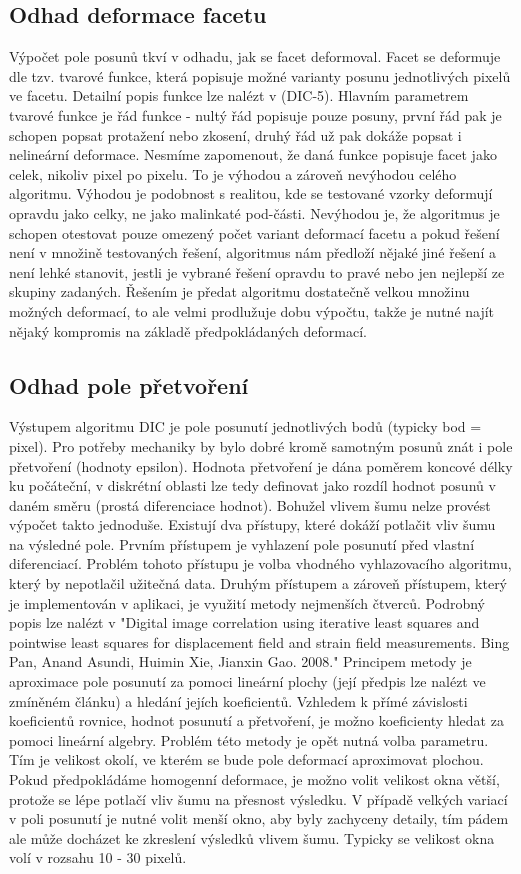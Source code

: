 \documentclass[a4paper,12pt]{article}
\begin{document}
\subsection{Odhad deformace facetu}
Výpočet pole posunů tkví v odhadu, jak se facet deformoval. Facet se deformuje dle tzv. tvarové funkce, která popisuje možné varianty posunu jednotlivých pixelů ve facetu. Detailní popis funkce lze nalézt v (DIC-5). Hlavním parametrem tvarové funkce je řád funkce - nultý řád popisuje pouze posuny, první řád pak je schopen popsat protažení nebo zkosení, druhý řád už pak dokáže popsat i nelineární deformace. Nesmíme zapomenout, že daná funkce popisuje facet jako celek, nikoliv pixel po pixelu. To je výhodou a zároveň nevýhodou celého algoritmu. Výhodou je podobnost s realitou, kde se testované vzorky deformují opravdu jako celky, ne jako malinkaté pod-části. Nevýhodou je, že algoritmus je schopen otestovat pouze omezený počet variant deformací facetu a pokud řešení není v množině testovaných řešení, algoritmus nám předloží nějaké jiné řešení a není lehké stanovit, jestli je vybrané řešení opravdu to pravé nebo jen nejlepší ze skupiny zadaných. Řešením je předat algoritmu dostatečně velkou množinu možných deformací, to ale velmi prodlužuje dobu výpočtu, takže je nutné najít nějaký kompromis na základě předpokládaných deformací.
\subsection{Odhad pole přetvoření}
Výstupem algoritmu DIC je pole posunutí jednotlivých bodů (typicky bod = pixel). Pro potřeby mechaniky by bylo dobré kromě samotným posunů znát i pole přetvoření (hodnoty epsilon). Hodnota přetvoření je dána poměrem koncové délky ku počáteční, v diskrétní oblasti lze tedy definovat jako rozdíl hodnot posunů v daném směru (prostá diferenciace hodnot). Bohužel vlivem šumu nelze provést výpočet takto jednoduše. Existují dva přístupy, které dokáží potlačit vliv šumu na výsledné pole. Prvním přístupem je vyhlazení pole posunutí před vlastní diferenciací. Problém tohoto přístupu je volba vhodného vyhlazovacího algoritmu, který by nepotlačil užitečná data. Druhým přístupem a zároveň přístupem, který je implementován v aplikaci, je využití metody nejmenších čtverců. Podrobný popis lze nalézt v "Digital image correlation using iterative least squares and pointwise least squares for displacement field and strain field measurements. Bing Pan, Anand Asundi, Huimin Xie, Jianxin Gao. 2008." Principem metody je aproximace pole posunutí za pomoci lineární plochy (její předpis lze nalézt ve zmíněném článku) a hledání jejích koeficientů. Vzhledem k přímé závislosti koeficientů rovnice, hodnot posunutí a přetvoření, je možno koeficienty hledat za pomoci lineární algebry. Problém této metody je opět nutná volba parametru. Tím je velikost okolí, ve kterém se bude pole deformací aproximovat plochou. Pokud předpokládáme homogenní deformace, je možno volit velikost okna větší, protože se lépe potlačí vliv šumu na přesnost výsledku. V případě velkých variací v poli posunutí je nutné volit menší okno, aby byly zachyceny detaily, tím pádem ale může docházet ke zkreslení výsledků vlivem šumu. Typicky se velikost okna volí v rozsahu 10 - 30 pixelů.
\newpage
\end{document}
